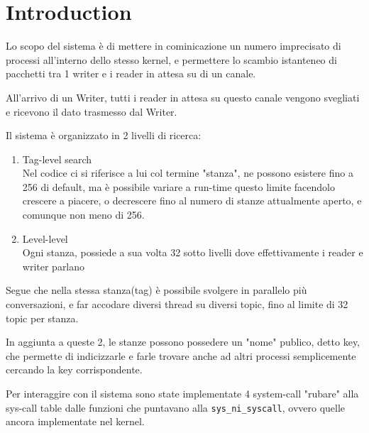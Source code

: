 \section{Introduction}

Lo scopo del sistema è di mettere in cominicazione un numero imprecisato di 
processi all'interno dello stesso kernel, e permettere lo scambio istanteneo
di pacchetti tra 1 writer e i reader in attesa su di un canale.

All'arrivo di un Writer, tutti i reader in attesa su questo canale vengono
svegliati e ricevono il dato trasmesso dal Writer.

Il sistema è organizzato in 2 livelli di ricerca:
\begin{enumerate}
	\item Tag-level search\\
	Nel codice ci si riferisce a lui col termine "stanza", ne possono esistere fino a 256 di default,
	ma è possibile variare a run-time questo limite facendolo crescere a piacere, o decrescere fino al
	numero di stanze attualmente aperto, e comunque non meno di 256.
	\item Level-level\\
	Ogni stanza, possiede a sua volta 32 sotto livelli dove effettivamente i reader e writer parlano
\end{enumerate}

Segue che nella stessa stanza(tag) è possibile svolgere in parallelo più conversazioni, e far accodare
diversi thread su diversi topic, fino al limite di 32 topic per stanza.

In aggiunta a queste 2, le stanze possono possedere un "nome" publico, detto key, che permette di
indicizzarle e farle trovare anche ad altri processi semplicemente cercando la key corrispondente.

Per interaggire con il sistema sono state implementate 4 system-call "rubare" alla
sys-call table dalle funzioni che puntavano alla \verb|sys_ni_syscall|, ovvero quelle ancora implementate nel kernel.

